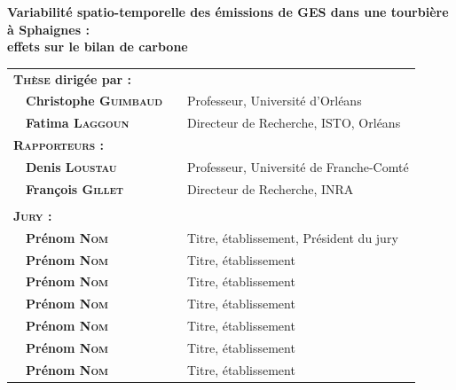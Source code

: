 {%
\vfill

\begin{framed}
	\begin{minipage}{\dimexpr\textwidth-2\fboxrule-2\fboxsep}
	\centering
		\vspace{0.2cm}
			{\Large\textbf{Variabilité spatio-temporelle des émissions de GES dans une tourbière à Sphaignes : \\effets sur le bilan de carbone}\\ \vspace{0.3cm}
			}
		\vspace{0.2cm}
	\end{minipage}
\end{framed}

} %

\vfill

\begin{center}
\begin{tabular}{l l l l}
\multicolumn{2}{l}{\textbf{\textsc{Thèse} dirig\'ee par : }} & & \\[.5ex]
	& \textbf{Christophe \textsc{Guimbaud}} &  &  Professeur, Université d'Orléans\\
	& \textbf{Fatima \textsc{Laggoun}} & &  Directeur de Recherche, ISTO, Orléans\\[1ex]
\multicolumn{2}{l}{\textsc{\textbf{Rapporteurs :}}} & & \\[.5ex]
	& \textbf{Denis \textsc{Loustau}} & &  Professeur, Université de Franche-Comté\\
	& \textbf{François \textsc{Gillet}} & &  Directeur de Recherche, INRA\\[1ex]
\hline\\ [-1ex]
\multicolumn{2}{l}{\textsc{\textbf{Jury : }}} & &\\[.5ex]
	&\textbf{Pr\'enom \textsc{Nom}} &  & Titre, \'etablissement, Pr\'esident du jury\\
	&\textbf{Pr\'enom \textsc{Nom}} &  &  Titre, \'etablissement\\
	&\textbf{Pr\'enom \textsc{Nom}} &  &  Titre, \'etablissement\\
	&\textbf{Pr\'enom \textsc{Nom}} &  &  Titre, \'etablissement\\
	&\textbf{Pr\'enom \textsc{Nom}} &  &  Titre, \'etablissement\\
	&\textbf{Pr\'enom \textsc{Nom}} &  &  Titre, \'etablissement\\
	&\textbf{Pr\'enom \textsc{Nom}} &  &  Titre, \'etablissement\\
\end{tabular}
\end{center}

\vfill

\restoregeometry %
